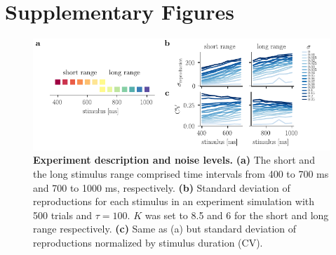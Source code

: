 \documentclass[10pt]{article}
\begin{document}
\section*{Supplementary Figures}
\begin{figure}[!htb]
	\centering
	\includegraphics{figures/supp_CV.pdf}
	\caption{\textbf{Experiment description and noise levels.} 
	\textbf{(a)} The short and the long stimulus range comprised time intervals from 400 to 700 ms and 700 to 1000 ms, respectively.
	\textbf{(b)} Standard deviation of reproductions for each stimulus in an experiment simulation with 500 trials and $\tau=100$. $K$ was set to 8.5 and 6 for the short and long range respectively. 
	\textbf{(c)} Same as (a) but standard deviation of reproductions normalized by stimulus duration (CV).
	}
\label{sup:CV}
\end{figure}
\end{document}
